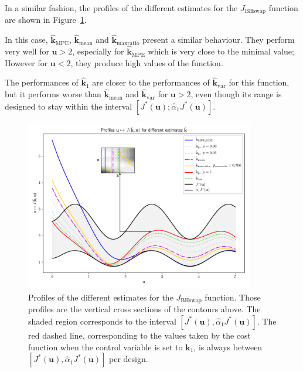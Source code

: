 \documentclass[preprint, 1p]{elsarticle}
\newcommand{\hatkmean}{\hat{\mathbf{k}}_{\mathrm{mean}}}
\newcommand{\hatkvar}{\hat{\mathbf{k}}_{\mathrm{var}}}
\newcommand{\hatkmpe}{\hat{\mathbf{k}}_{\mathrm{MPE}}}
\newcommand{\checka}{{\alpha}}
\newcommand{\checkk}{\mathbf{k}}
\begin{document}
In a similar fashion, the profiles of the different estimates for the $J_{\mathrm{BHswap}}$ function are shown in Figure~\ref{fig:profiles_branin_switch}.

In this case, $\hatkmpe$, $\hatkmean$ and $\hat{\checkk}_{\mathrm{maxratio}}$ present a similar behaviour. They perform very well for $\mathbf{u}>2$, especially for $\hatkmpe$ which is very close to the minimal value; However for $\mathbf{u}<2$, they produce high values of the function.

The performances of $\hat{\checkk}_1$ are closer to the performances of $\hatkvar$ for this function, but it performs worse than $\hatkmean$ and $\hatkvar$ for $\mathbf{u}>2$, even though its range is designed to stay within the interval $[J^*(\mathbf{u}); \hat{\checka}_1 J^*(\mathbf{u})]$.


\begin{figure}[t]
  \centering
\includegraphics[width=10cm]{Figures/profile_BHs_all_estimates_noku.pdf}
\caption{Profiles of the different estimates for the $J_{\mathrm{BHswap}}$ function. Those profiles are the vertical cross sections of the contours above. The shaded region corresponds to the interval $[J^*(\mathbf{u}), \hat{\checka}_1 J^*(\mathbf{u})]$. The red dashed line, corresponding to the values taken by the cost function when the control variable is set to $\mathbf{k}_1$, is always between $[J^*(\mathbf{u}), \hat{\checka}_1 J^*(\mathbf{u})]$ per design.}
\label{fig:profiles_branin_switch}
\end{figure}





\clearpage
\end{document}
